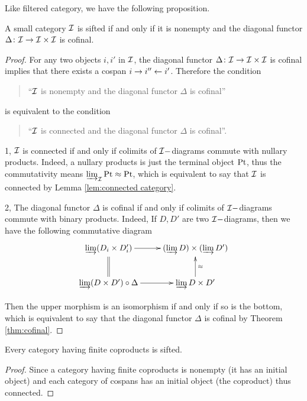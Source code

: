   Like filtered category, we have the following proposition.
  \begin{prop}
    A small category ${\cal I}$ is sifted if and only if it is nonempty and the diagonal functor $\Delta\colon{\cal I}\to{\cal I}\times{\cal I}$ is cofinal.
  \end{prop}
  \begin{proof}
    For any two objects $i,i'$ in ${\cal I}$, the diagonal functor $\Delta\colon{\cal I}\to{\cal I}\times{\cal I}$ is cofinal implies that there exists a cospan $i\to i''\leftarrow i'$. Therefore the condition
    \begin{quote}
    ``${\cal I}$ is nonempty and the diagonal functor $\Delta$ is cofinal''
    \end{quote}
    is equivalent to the condition
    \begin{quote}
    ``${\cal I}$ is connected and the diagonal functor $\Delta$ is cofinal''.
    \end{quote}

    1, ${\cal I}$ is connected if and only if colimits of ${\cal I}-$diagrams commute with nullary products. Indeed, a nullary products is just the terminal object $\operatorname{Pt}$, thus the commutativity means $\operatorname*{\underrightarrow{\lim}}_{{\cal I}}\operatorname{Pt}\approx\operatorname{Pt}$, which is equivalent to say that ${\cal I}$ is connected by Lemma \ref{lem:connected category}.

    2, The diagonal functor $\Delta$ is cofinal if and only if colimits of ${\cal I}-$diagrams commute with binary products. Indeed, If $D,D'$ are two ${\cal I}-$diagrams, then we have the following commutative diagram
    \begin{displaymath}
      \xymatrix{
        \dirlim (D_i\times D'_i) \ar[r]\ar@{=}[d]& (\dirlim D) \times (\dirlim D')\\
        \dirlim (D\times D')\circ\Delta \ar[r]& \dirlim D\times D'\ar[u]_-{\approx}
        }
    \end{displaymath}

    Then the upper morphism is an isomorphism if and only if so is the bottom, which is equivalent to say that the diagonal functor $\Delta$ is cofinal by Theorem \ref{thm:cofinal}.
  \end{proof}
  \begin{cor}
    Every category having finite coproducts is sifted.
  \end{cor}
  \begin{proof}
    Since a category having finite coproducts is nonempty (it has an initial object) and each category of cospans has an initial object (the coproduct) thus connected.
  \end{proof}

